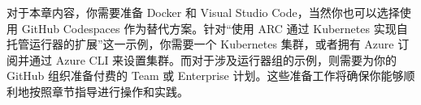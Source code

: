 

对于本章内容，你需要准备 Docker 和 Visual Studio Code，当然你也可以选择使用 GitHub Codespaces 作为替代方案。针对“使用 ARC 通过 Kubernetes 实现自托管运行器的扩展”这一示例，你需要一个 Kubernetes 集群，或者拥有 Azure 订阅并通过 Azure CLI 来设置集群。而对于涉及运行器组的示例，则需要为你的 GitHub 组织准备付费的 Team 或 Enterprise 计划。这些准备工作将确保你能够顺利地按照章节指导进行操作和实践。






